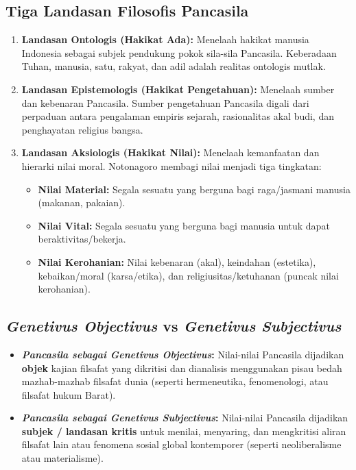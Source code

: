 \documentclass[10pt,a4paper]{article}
\begin{document}
\subsection{Tiga Landasan Filosofis Pancasila}
\begin{enumerate}
  \item \textbf{Landasan Ontologis (Hakikat Ada):} Menelaah hakikat manusia Indonesia sebagai subjek pendukung pokok sila-sila Pancasila. Keberadaan Tuhan, manusia, satu, rakyat, dan adil adalah realitas ontologis mutlak.
  \item \textbf{Landasan Epistemologis (Hakikat Pengetahuan):} Menelaah sumber dan kebenaran Pancasila. Sumber pengetahuan Pancasila digali dari perpaduan antara pengalaman empiris sejarah, rasionalitas akal budi, dan penghayatan religius bangsa.
  \item \textbf{Landasan Aksiologis (Hakikat Nilai):} Menelaah kemanfaatan dan hierarki nilai moral. Notonagoro membagi nilai menjadi tiga tingkatan:
    \begin{itemize}
      \item \textbf{Nilai Material:} Segala sesuatu yang berguna bagi raga/jasmani manusia (makanan, pakaian).
      \item \textbf{Nilai Vital:} Segala sesuatu yang berguna bagi manusia untuk dapat beraktivitas/bekerja.
      \item \textbf{Nilai Kerohanian:} Nilai kebenaran (akal), keindahan (estetika), kebaikan/moral (karsa/etika), dan religiusitas/ketuhanan (puncak nilai kerohanian).
    \end{itemize}
\end{enumerate}

\subsection{\textit{Genetivus Objectivus} vs \textit{Genetivus Subjectivus}}
\begin{conceptbox}
\begin{itemize}
  \item \textbf{\textit{Pancasila sebagai Genetivus Objectivus}:} Nilai-nilai Pancasila dijadikan \textbf{objek} kajian filsafat yang dikritisi dan dianalisis menggunakan pisau bedah mazhab-mazhab filsafat dunia (seperti hermeneutika, fenomenologi, atau filsafat hukum Barat).
  \item \textbf{\textit{Pancasila sebagai Genetivus Subjectivus}:} Nilai-nilai Pancasila dijadikan \textbf{subjek / landasan kritis} untuk menilai, menyaring, dan mengkritisi aliran filsafat lain atau fenomena sosial global kontemporer (seperti neoliberalisme atau materialisme).
\end{itemize}
\end{conceptbox}
\end{document}
